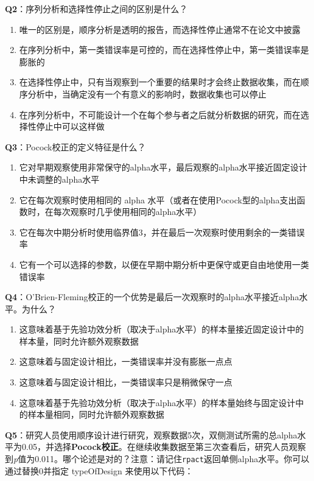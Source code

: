 \documentclass[
  letterpaper,
  DIV=11,
  numbers=noendperiod]{scrreprt}
\providecommand{\tightlist}{%
  \setlength{\itemsep}{0pt}\setlength{\parskip}{0pt}}\usepackage{longtable,booktabs,array}
\begin{document}
\textbf{Q2}：序列分析和选择性停止之间的区别是什么？

\begin{enumerate}
\def\labelenumi{\Alph{enumi})}
\tightlist
\item
  唯一的区别是，顺序分析是透明的报告，而选择性停止通常不在论文中披露
\item
  在序列分析中，第一类错误率是可控的，而在选择性停止中，第一类错误率是膨胀的
\item
  在选择性停止中，只有当观察到一个重要的结果时才会终止数据收集，而在顺序分析中，当确定没有一个有意义的影响时，数据收集也可以停止
\item
  在序列分析中，不可能设计一个在每个参与者之后就分析数据的研究，而在选择性停止中可以这样做
\end{enumerate}

\textbf{Q3}：Pocock校正的定义特征是什么？

\begin{enumerate}
\def\labelenumi{\Alph{enumi})}
\tightlist
\item
  它对早期观察使用非常保守的alpha水平，最后观察的alpha水平接近固定设计中未调整的alpha水平
\item
  它在每次观察时使用相同的 alpha
  水平（或者在使用Pocock型的alpha支出函数时，在每次观察时几乎使用相同的alpha水平）
\item
  它在每次中期分析时使用临界值3，并在最后一次观察时使用剩余的一类错误率
\item
  它有一个可以选择的参数，以便在早期中期分析中更保守或更自由地使用一类错误率
\end{enumerate}

\textbf{Q4}：O'Brien-Fleming校正的一个优势是最后一次观察时的alpha水平接近alpha水平。为什么？

\begin{enumerate}
\def\labelenumi{\Alph{enumi})}
\tightlist
\item
  这意味着基于先验功效分析（取决于alpha水平）的样本量接近固定设计中的样本量，同时允许额外观察数据
\item
  这意味着与固定设计相比，一类错误率并没有膨胀一点点
\item
  这意味着与固定设计相比，一类错误率只是稍微保守一点
\item
  这意味着基于先验功效分析（取决于alpha水平）的样本量始终与固定设计中的样本量相同，同时允许额外观察数据
\end{enumerate}

\textbf{Q5}：研究人员使用顺序设计进行研究，观察数据5次，双侧测试所需的总alpha水平为0.05，并选择\textbf{Pocock校正}。在继续收集数据至第三次查看后，研究人员观察到\emph{p}值为0.011。哪个论述是对的？注意：请记住\texttt{rpact}返回单侧alpha水平。你可以通过替换0并指定
typeOfDesign 来使用以下代码：
\end{document}

